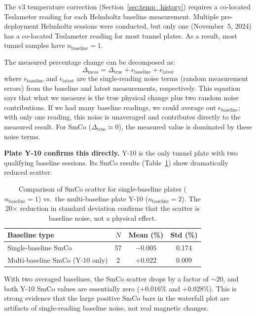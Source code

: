 \documentclass[11pt,letterpaper]{article}
\newcommand{\smco}{SmCo}
\begin{document}
The v3 temperature correction (Section~\ref{sec:temp_history}) requires a
co-located Teslameter reading for each Helmholtz baseline measurement.
Multiple pre-deployment Helmholtz sessions were conducted, but only one
(November~5, 2024) has a co-located Teslameter reading for most tunnel plates.
As a result, most tunnel samples have $n_{\mathrm{baseline}} = 1$.

The measured percentage change can be decomposed as:
\begin{equation}
\label{eq:noise_decomposition}
\Delta_{\mathrm{meas}} = \Delta_{\mathrm{true}} + \epsilon_{\mathrm{baseline}} + \epsilon_{\mathrm{latest}}
\end{equation}
where $\epsilon_{\mathrm{baseline}}$ and $\epsilon_{\mathrm{latest}}$ are the
single-reading noise terms (random measurement errors) from the baseline and
latest measurements, respectively.  This equation says that what we measure is
the true physical change plus two random noise contributions.  If we had many
baseline readings, we could average out $\epsilon_{\mathrm{baseline}}$; with
only one reading, this noise is unaveraged and contributes directly to the
measured result.  For \smco{} ($\Delta_{\mathrm{true}} \approx 0$), the
measured value is dominated by these noise terms.

\textbf{Plate Y-10 confirms this directly.}  Y-10 is the only tunnel plate
with two qualifying baseline sessions.  Its \smco{} results
(Table~\ref{tab:y10_vs_single}) show dramatically reduced scatter:

\begin{table}[H]
\centering
\caption{Comparison of \smco{} scatter for single-baseline plates
($n_{\mathrm{baseline}} = 1$) vs.\ the multi-baseline plate Y-10
($n_{\mathrm{baseline}} = 2$).  The 20$\times$ reduction in standard
deviation confirms that the scatter is baseline noise, not a physical effect.}
\label{tab:y10_vs_single}
\begin{tabular}{@{}lccc@{}}
\toprule
\textbf{Baseline type} & $N$ & \textbf{Mean (\%)} & \textbf{Std (\%)} \\
\midrule
Single-baseline \smco{} & 57 & $-0.005$ & 0.174 \\
Multi-baseline \smco{} (Y-10 only) & 2 & $+0.022$ & 0.009 \\
\bottomrule
\end{tabular}
\end{table}

With two averaged baselines, the \smco{} scatter drops by a factor of
$\sim$20, and both Y-10 \smco{} values are essentially zero ($+0.016\%$ and
$+0.028\%$).  This is strong evidence that the large positive \smco{} bars in
the waterfall plot are artifacts of single-reading baseline noise, not real
magnetic changes.
\end{document}
